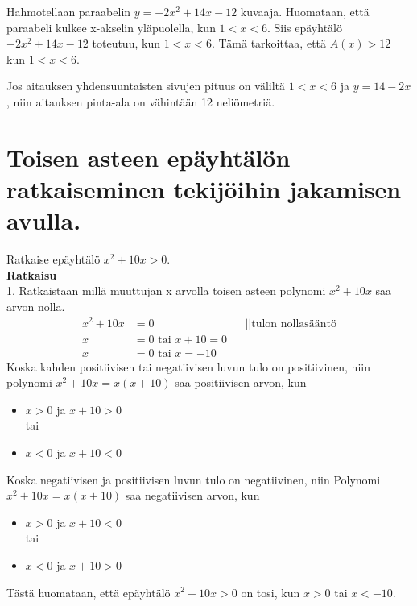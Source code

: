 \begin{esimerkki}
Hahmotellaan paraabelin $y=-2x^2+14x-12$ kuvaaja. Huomataan, että paraabeli kulkee x-akselin yläpuolella, kun $1<x<6$. 
Siis epäyhtälö $-2x^2+14x-12$ toteutuu, kun $1<x<6$. Tämä tarkoittaa, että $A(x)>12$ kun $1<x<6$.

Jos aitauksen yhdensuuntaisten sivujen pituus on väliltä $1<x<6$ ja $y=14-2x$, niin aitauksen pinta-ala on vähintään 12 neliömetriä.
\end{esimerkki}
\section{Toisen asteen epäyhtälön ratkaiseminen tekijöihin jakamisen avulla.}
\begin{esimerkki} 
Ratkaise epäyhtälö $x^2+10x>0$. \\
\textbf{Ratkaisu} \\
1. Ratkaistaan millä muuttujan x arvolla toisen asteen polynomi $x^2+10x$ saa arvon nolla. 
\begin{align*}
x^2+10x&=0 \ \ \ \ &&||\text{tulon nollasääntö} \\
x&=0 \text{ tai } x+10=0 \\
x&=0 \text{ tai } x=-10
\end{align*}
Koska kahden positiivisen tai negatiivisen luvun tulo on positiivinen, niin
polynomi $x^2+10x=x(x+10)$ saa positiivisen arvon, kun 
\begin{itemize}
\item{$x>0$ ja $x+10>0$} \\tai \\
\item{$x<0$ ja $x+10<0$} 
\end{itemize}
Koska negatiivisen ja positiivisen luvun tulo on negatiivinen, niin
Polynomi $x^2+10x=x(x+10)$ saa negatiivisen arvon, kun
\begin{itemize}
\item{$x>0$ ja $x+10<0$} \\ tai \\
\item{$x<0$ ja $x+10>0$} \\
\end{itemize}
Tästä huomataan, että epäyhtälö $x^2+10x>0$ on tosi, kun $x>0$ tai $x<-10$. 
\end{esimerkki} 
